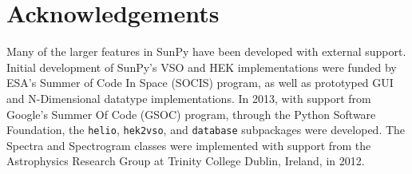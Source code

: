 \section{Acknowledgements}
Many of the larger features in SunPy have been developed with external support. 
Initial development of SunPy's VSO and HEK implementations were funded by ESA's 
Summer of Code In Space (SOCIS) program, as well as prototyped GUI and 
N-Dimensional datatype implementations. In 2013, with support from Google's 
Summer Of Code (GSOC) program, through the Python Software Foundation, the 
\texttt{helio}, \texttt{hek2vso}, and \texttt{database} subpackages were 
developed. The Spectra and Spectrogram classes were implemented with support 
from the Astrophysics Research Group at Trinity College Dublin, Ireland, in 
2012.